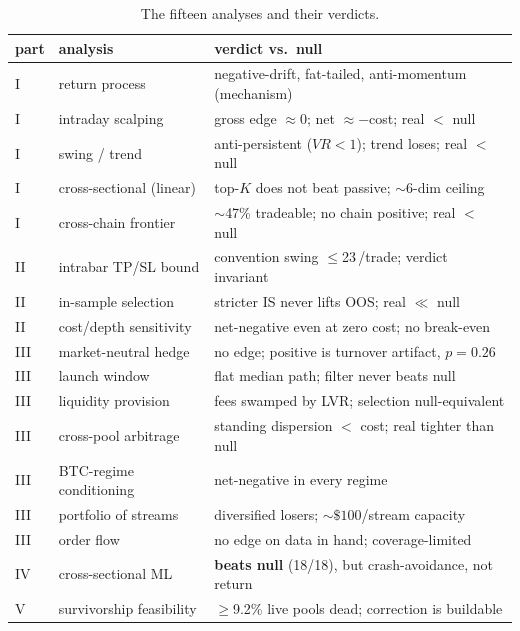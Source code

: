 \documentclass[12pt]{article}
\newcommand{\bp}{\,\text{bp}}
\begin{document}
\begin{table}[tbp]\centering\small
\caption{The fifteen analyses and their verdicts.}\label{tab:inventory}
\begin{tabular}{llp{8.6cm}}\toprule
part & analysis & verdict vs.\ null\\\midrule
I & return process        & negative-drift, fat-tailed, anti-momentum (mechanism)\\
I & intraday scalping      & gross edge $\approx0$; net $\approx-$cost; real $<$ null\\
I & swing / trend          & anti-persistent ($VR<1$); trend loses; real $<$ null\\
I & cross-sectional (linear)& top-$K$ does not beat passive; $\sim$6-dim ceiling\\
I & cross-chain frontier   & $\sim$47\% tradeable; no chain positive; real $<$ null\\
II & intrabar TP/SL bound   & convention swing $\leq$23\bp/trade; verdict invariant\\
II & in-sample selection    & stricter IS never lifts OOS; real $\ll$ null\\
II & cost/depth sensitivity & net-negative even at zero cost; no break-even\\
III & market-neutral hedge   & no edge; positive is turnover artifact, $p=0.26$\\
III & launch window          & flat median path; filter never beats null\\
III & liquidity provision    & fees swamped by LVR; selection null-equivalent\\
III & cross-pool arbitrage   & standing dispersion $<$ cost; real tighter than null\\
III & BTC-regime conditioning& net-negative in every regime\\
III & portfolio of streams   & diversified losers; $\sim\$100$/stream capacity\\
III & order flow             & no edge on data in hand; coverage-limited\\
IV & cross-sectional ML     & \textbf{beats null} (18/18), but crash-avoidance, not return\\
V & survivorship feasibility& $\geq$9.2\% live pools dead; correction is buildable\\\bottomrule
\end{tabular}
\end{table}
\end{document}
